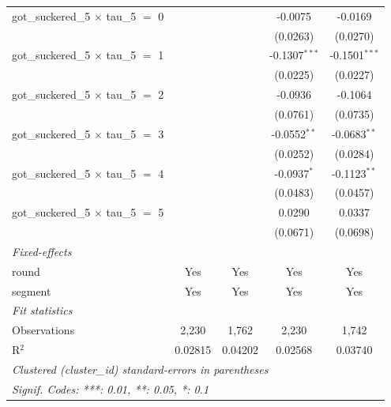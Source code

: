 \begin{tabular}{lcccc}
   got\_suckered\_5 $\times$ tau\_5 $=$ 0        &                 &                 & -0.0075               & -0.0169\\   
                                                 &                 &                 & (0.0263)              & (0.0270)\\   
   got\_suckered\_5 $\times$ tau\_5 $=$ 1        &                 &                 & -0.1307$^{***}$       & -0.1501$^{***}$\\   
                                                 &                 &                 & (0.0225)              & (0.0227)\\   
   got\_suckered\_5 $\times$ tau\_5 $=$ 2        &                 &                 & -0.0936               & -0.1064\\   
                                                 &                 &                 & (0.0761)              & (0.0735)\\   
   got\_suckered\_5 $\times$ tau\_5 $=$ 3        &                 &                 & -0.0552$^{**}$        & -0.0683$^{**}$\\   
                                                 &                 &                 & (0.0252)              & (0.0284)\\   
   got\_suckered\_5 $\times$ tau\_5 $=$ 4        &                 &                 & -0.0937$^{*}$         & -0.1123$^{**}$\\   
                                                 &                 &                 & (0.0483)              & (0.0457)\\   
   got\_suckered\_5 $\times$ tau\_5 $=$ 5        &                 &                 & 0.0290                & 0.0337\\   
                                                 &                 &                 & (0.0671)              & (0.0698)\\   
   \midrule
   \emph{Fixed-effects}\\
   round                                         & Yes             & Yes             & Yes                   & Yes\\  
   segment                                       & Yes             & Yes             & Yes                   & Yes\\  
   \midrule
   \emph{Fit statistics}\\
   Observations                                  & 2,230           & 1,762           & 2,230                 & 1,742\\  
   R$^2$                                         & 0.02815         & 0.04202         & 0.02568               & 0.03740\\  
   \midrule \midrule
   \multicolumn{5}{l}{\emph{Clustered (cluster\_id) standard-errors in parentheses}}\\
   \multicolumn{5}{l}{\emph{Signif. Codes: ***: 0.01, **: 0.05, *: 0.1}}\\
\end{tabular}
\par\endgroup


